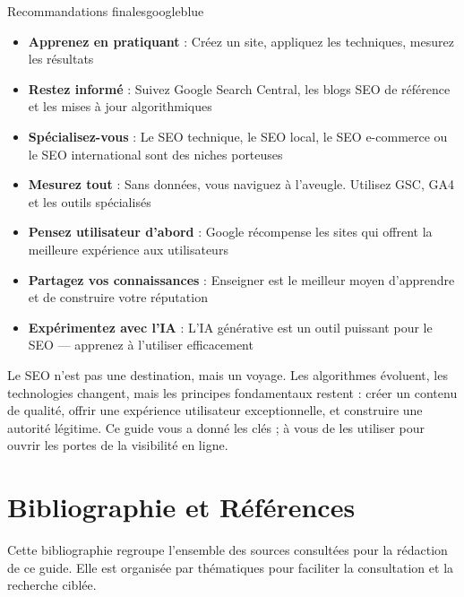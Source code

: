 \documentclass[12pt,a4paper,twoside]{report}
\begin{document}
\begin{mybox}{Recommandations finales}{googleblue}
\begin{itemize}
    \item \textbf{Apprenez en pratiquant} : Créez un site, appliquez les techniques, mesurez les résultats
    \item \textbf{Restez informé} : Suivez Google Search Central, les blogs SEO de référence et les mises à jour algorithmiques
    \item \textbf{Spécialisez-vous} : Le SEO technique, le SEO local, le SEO e-commerce ou le SEO international sont des niches porteuses
    \item \textbf{Mesurez tout} : Sans données, vous naviguez à l'aveugle. Utilisez GSC, GA4 et les outils spécialisés
    \item \textbf{Pensez utilisateur d'abord} : Google récompense les sites qui offrent la meilleure expérience aux utilisateurs
    \item \textbf{Partagez vos connaissances} : Enseigner est le meilleur moyen d'apprendre et de construire votre réputation
    \item \textbf{Expérimentez avec l'IA} : L'IA générative est un outil puissant pour le SEO — apprenez à l'utiliser efficacement
\end{itemize}
\end{mybox}

\vspace{0.3cm}
\noindent Le SEO n'est pas une destination, mais un voyage. Les algorithmes évoluent, les technologies changent, mais les principes fondamentaux restent : créer un contenu de qualité, offrir une expérience utilisateur exceptionnelle, et construire une autorité légitime. Ce guide vous a donné les clés ; à vous de les utiliser pour ouvrir les portes de la visibilité en ligne.

\chapter*{Bibliographie et Références}

Cette bibliographie regroupe l'ensemble des sources consultées pour la rédaction de ce guide. Elle est organisée par thématiques pour faciliter la consultation et la recherche ciblée.
\end{document}
